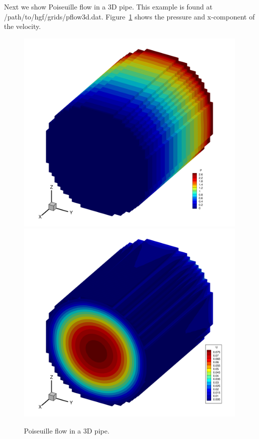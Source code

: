 \documentclass{report}
\begin{document}
Next we show Poiseuille flow in a 3D pipe. This
example is found at /path/to/hgf/grids/pflow3d.dat. Figure~\ref{fig:3dpflow}
shows the pressure and x-component of the velocity.\\
\begin{figure}
  \centering
  \includegraphics[width=.7\textwidth]{images/pflow3dP.png}\\
  \includegraphics[width=.7\textwidth]{images/pflow3dU.png}
  \caption{\label{fig:3dpflow}Poiseuille flow in a 3D pipe.}
\end{figure}
\end{document}
